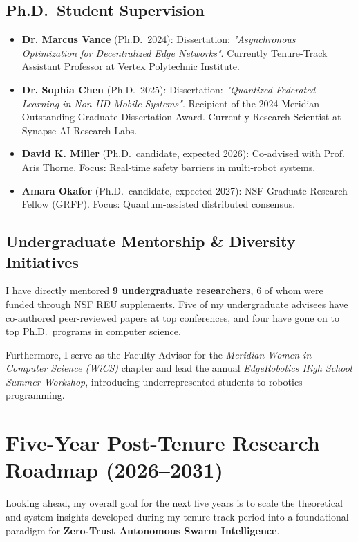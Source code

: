 \documentclass[11pt, a4paper, parskip=half]{scrartcl}
\begin{document}
\subsection{Ph.D.\ Student Supervision}
\begin{itemize}
  \item \textbf{Dr. Marcus Vance} (Ph.D.\ 2024): Dissertation: \textit{"Asynchronous Optimization for Decentralized Edge Networks"}. Currently Tenure-Track Assistant Professor at Vertex Polytechnic Institute.
  \item \textbf{Dr. Sophia Chen} (Ph.D.\ 2025): Dissertation: \textit{"Quantized Federated Learning in Non-IID Mobile Systems"}. Recipient of the 2024 Meridian Outstanding Graduate Dissertation Award. Currently Research Scientist at Synapse AI Research Labs.
  \item \textbf{David K. Miller} (Ph.D.\ candidate, expected 2026): Co-advised with Prof. Aris Thorne. Focus: Real-time safety barriers in multi-robot systems.
  \item \textbf{Amara Okafor} (Ph.D.\ candidate, expected 2027): NSF Graduate Research Fellow (GRFP). Focus: Quantum-assisted distributed consensus.
\end{itemize}

\subsection{Undergraduate Mentorship \& Diversity Initiatives}
I have directly mentored \textbf{9 undergraduate researchers}, 6 of whom were funded through NSF REU supplements. Five of my undergraduate advisees have co-authored peer-reviewed papers at top conferences, and four have gone on to top Ph.D.\ programs in computer science.

Furthermore, I serve as the Faculty Advisor for the \textit{Meridian Women in Computer Science (WiCS)} chapter and lead the annual \textit{EdgeRobotics High School Summer Workshop}, introducing underrepresented students to robotics programming.

\section{Five-Year Post-Tenure Research Roadmap (2026--2031)}

Looking ahead, my overall goal for the next five years is to scale the theoretical and system insights developed during my tenure-track period into a foundational paradigm for \textbf{Zero-Trust Autonomous Swarm Intelligence}.
\end{document}
